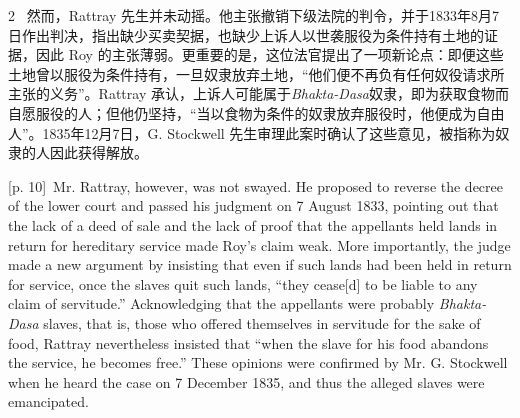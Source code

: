 \documentclass[10pt,a4paper]{article}
\begin{document}
\begin{paracol}{2}
\switchcolumn*
{\scriptsize\color{gray} [p. 10]}\ 然而，Rattray 先生并未动摇。他主张撤销下级法院的判令，并于1833年8月7日作出判决，指出缺少买卖契据，也缺少上诉人以世袭服役为条件持有土地的证据，因此 Roy 的主张薄弱。更重要的是，这位法官提出了一项新论点：即便这些土地曾以服役为条件持有，一旦奴隶放弃土地，“他们便不再负有任何奴役请求所主张的义务”。Rattray 承认，上诉人可能属于\textit{Bhakta-Dasa}奴隶，即为获取食物而自愿服役的人；但他仍坚持，“当以食物为条件的奴隶放弃服役时，他便成为自由人”。1835年12月7日，G. Stockwell 先生审理此案时确认了这些意见，被指称为奴隶的人因此获得解放。\par
\switchcolumn
{\scriptsize\color{gray} [p. 10]}\ Mr. Rattray, however, was not swayed. He proposed to reverse the decree of the lower court and passed his judgment on 7 August 1833, pointing out that the lack of a deed of sale and the lack of proof that the appellants held lands in return for hereditary service made Roy’s claim weak. More importantly, the judge made a new argument by insisting that even if such lands had been held in return for service, once the slaves quit such lands, “they cease[d] to be liable to any claim of servitude.” Acknowledging that the appellants were probably \textit{Bhakta-Dasa} slaves, that is, those who offered themselves in servitude for the sake of food, Rattray nevertheless insisted that “when the slave for his food abandons the service, he becomes free.” These opinions were confirmed by Mr. G. Stockwell when he heard the case on 7 December 1835, and thus the alleged slaves were emancipated.\par
\switchcolumn*

\end{paracol}
\end{document}
